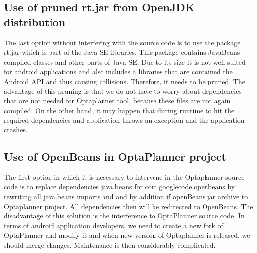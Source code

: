 \subsection{Use of pruned rt.jar from OpenJDK distribution}
The last option without interfering with the source code is to use the package rt.jar which is part of the Java SE libraries. This package contains JavaBeans compiled classes and other parts of Java SE. Due to its size it is not well suited for android applications and also includes a libraries that are contained the Android API and thus causing collisions. Therefore, it needs to be pruned. The advantage of this pruning is that we do not have to worry about dependencies that are not needed for Optaplanner tool, because these files are not again compiled. On the other hand, it may happen that during runtime to hit the required dependencies and application throws an exception and the application crashes.

\subsection{Use of OpenBeans in OptaPlanner project}
The first option in which it is necessary to intervene in the Optaplanner source code is to replace dependencies java.beans for com.googlecode.openbeans by rewriting all java.beans imports and and by addition if openBeans.jar archive to Optaplanner project. All dependencies then will be redirected to OpenBeans. The disadvantage of this solution is the interference to OptaPlanner source code.  In terms of android application developers, we need to create a new fork of OptaPlanner and modify it and when new version of Optaplanner is released, we should merge changes. Maintenance is then considerably complicated.

